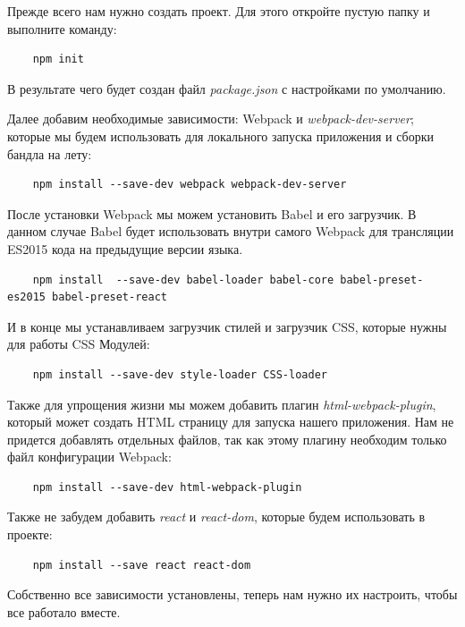 Прежде всего нам нужно создать проект. Для этого откройте пустую папку и выполните команду:

\begin{lstlisting}
	npm init
\end{lstlisting}

В результате чего будет создан файл \textit{package.json} с настройками по умолчанию.

Далее добавим необходимые зависимости: Webpack и \textit{webpack-dev-server}; которые мы будем использовать для локального запуска приложения и сборки бандла на лету:

\begin{lstlisting}
	npm install --save-dev webpack webpack-dev-server
\end{lstlisting}

После установки Webpack мы можем установить Babel и его загрузчик. В данном случае Babel будет использовать внутри самого Webpack для трансляции ES2015 кода на предыдущие версии языка. 

\begin{lstlisting}
	npm install  --save-dev babel-loader babel-core babel-preset-es2015 babel-preset-react
\end{lstlisting}

И в конце мы устанавливаем загрузчик стилей и загрузчик CSS, которые нужны для работы CSS Модулей:

\begin{lstlisting}
	npm install --save-dev style-loader CSS-loader
\end{lstlisting}

Также для упрощения жизни мы можем добавить плагин \textit{html-webpack-plugin}, который может создать HTML страницу для запуска нашего приложения. Нам не придется добавлять отдельных файлов, так как этому плагину необходим только файл конфигурации Webpack:

\begin{lstlisting}
	npm install --save-dev html-webpack-plugin
\end{lstlisting}

Также не забудем добавить \textit{react} и \textit{react-dom}, которые будем использовать в проекте:

\begin{lstlisting}
	npm install --save react react-dom
\end{lstlisting}

Собственно все зависимости установлены, теперь нам нужно их настроить, чтобы все работало вместе.

